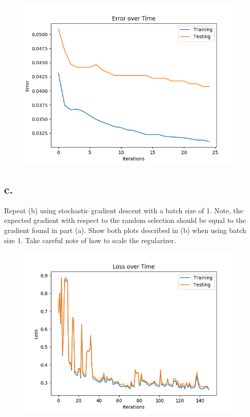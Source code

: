 \documentclass{article}
\newcommand{\1}{\mathbf{1}}
\begin{document}
{\begin{figure}[hb]
  \centering
  \includegraphics[width=150mm]{../hw2-code/results/a6_bii.png}
\end{figure}

\subsection*{c.}

Repeat (b) using stochastic gradient descent with a batch size of 1. Note, the expected gradient with respect to the random selection should be equal to the gradient found in part (a). Show both plots described in (b) when using batch size 1. Take careful note of how to scale the regularizer.

\begin{figure}[hb]
  \centering
  \includegraphics[width=150mm]{../hw2-code/results/a6_ci.png}
\end{figure}

}
\end{document}

